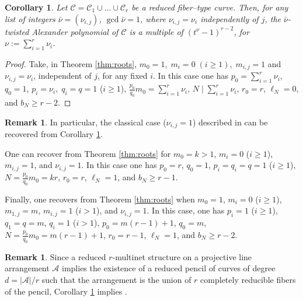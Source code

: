 \documentclass[11pt]{amsart}
\def\cC{\mathcal{C}}
\theoremstyle{plain}
\newtheorem{corollary}[thm]{Corollary}
\theoremstyle{definition}
\newtheorem{remark}[thm]{Remark}
\begin{document}
\begin{corollary}\label{cor:N|r}
Let $\cC= \cC_1 \cup \ldots \cup \cC_r$ be a reduced fiber--type curve. Then, for any list of integers $\bar \nu=(\nu_{i,j})$, $\gcd \bar\nu=1$, where $\nu_{i,j}=\nu_i$ independently of $j$, the $\bar\nu$-twisted Alexander polynomial of $\cC$ is a multiple of $(t^\nu-1)^{r-2}$, for $\nu:=\sum_{i=1}^r \nu_i$.
\end{corollary}
\begin{proof}
Take, in Theorem \ref{thm:roots},
$m_0=1, \; m_i=0\; (i\geq 1), \; m_{i,j}=1$ and $\nu_{i,j}=\nu_i$, independent of $j$, for any fixed $i$.
 In this case one has $p_0=\sum_{i=1}^r \nu_i$, $q_0=1$, $p_i= \nu_i, \; q_i=q=1$ ($i\geq 1$), $\frac{p_0}{q_0}m_0=\sum_{i=1}^r \nu_i$, $N\mid \sum_{i=1}^r \nu_i$, $r_0=r$, $\ell_N=0$, and $b_N\geq r-2$. 
\end{proof}

\begin{remark}
\label{rem:generalizations}
In particular, the classical case ($\nu_{i,j}=1$) described in \cite[Corollary 3.2]{DPS} can be recovered from Corollary \ref{cor:N|r}.

One can recover \cite[Theorem 3.3]{DPS} from Theorem \ref{thm:roots} for $m_0=k>1$, $m_i=0$ ($i\geq 1$), $m_{i,j}=1$, and $\nu_{i,j}=1$. In this case one has $p_0=r$, $q_0=1$, $p_i=q_i=q=1$ ($i\geq 1$), $N=\frac{p_0}{q_0}m_0=kr$, $r_0=r$, $\ell_N=1$, and $b_N\geq r-1$. 

Finally, one recovers \cite[Theorem 3.4]{DPS} from Theorem \ref{thm:roots} when $m_0=1$, $m_i=0$ ($i\geq 1$), $m_{1,j}=m$, $m_{i,j}=1$ ($i>1$), and $\nu_{i,j}=1$. In this case, one has $p_i=1$ ($i\geq 1$), $q_1=q=m$, $q_i=1$ ($i>1$), $p_0=m(r-1)+1$, $q_0=m$, $N=\frac{p_0}{q_0}m_0=m(r-1)+1$, $r_0=r-1$, $\ell_N=1$, and $b_N\geq r-2$. 
\end{remark}

\begin{remark}\label{rem:thm8.3[PS3]}
Since a reduced $r$-multinet structure on a projective line arrangement $\mathcal{A}$ implies the existence of a reduced pencil of curves of degree $d=|\mathcal{A}|/r$ such that the arrangement is the union of $r$ completely reducible fibers of the pencil,  Corollary \ref{cor:N|r} implies \cite[Theorem 8.3]{PS3}.
\end{remark}
\end{document}
